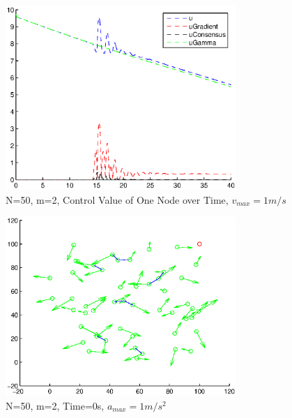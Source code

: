 \documentclass[10pt, conference]{IEEEtran}
\begin{document}
\begin{figure}[!h]
  \begin{center}
    \includegraphics[width=3.45in]{n50m2vmax1control}
  \end{center}

  \caption{\small N=50, m=2, Control Value of One Node over Time, $v_{max}=1m/s$}
  \label{fig:n50m2vmax1control}
\end{figure}


\clearpage

\begin{figure}[!h]
  \begin{center}
    \includegraphics[width=3.45in]{n50m2vmax1000amax1t00}
  \end{center}

  \caption{\small N=50, m=2, Time=0s, $a_{max}=1m/s^2$}
  \label{fig:n50m2vmax1000amax1t00}
\end{figure}
\end{document}
